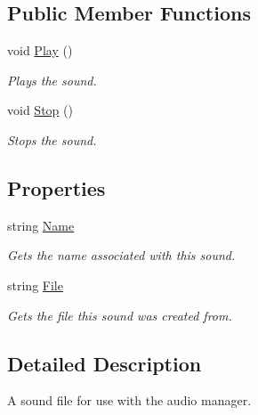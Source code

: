 \subsection*{Public Member Functions}
\begin{DoxyCompactItemize}
\item 
void \hyperlink{interface_tri_devs_1_1_tri_engine_1_1_audio_1_1_i_sound_aebcbc90990e32b903d2fda6d9fbe618a}{Play} ()
\begin{DoxyCompactList}\small\item\em Plays the sound. \end{DoxyCompactList}\item 
void \hyperlink{interface_tri_devs_1_1_tri_engine_1_1_audio_1_1_i_sound_a800d5a5531dee0eb4718c12bf76a7663}{Stop} ()
\begin{DoxyCompactList}\small\item\em Stops the sound. \end{DoxyCompactList}\end{DoxyCompactItemize}
\subsection*{Properties}
\begin{DoxyCompactItemize}
\item 
string \hyperlink{interface_tri_devs_1_1_tri_engine_1_1_audio_1_1_i_sound_a92371bfd019441c3766d5e61f126de82}{Name}
\begin{DoxyCompactList}\small\item\em Gets the name associated with this sound. \end{DoxyCompactList}\item 
string \hyperlink{interface_tri_devs_1_1_tri_engine_1_1_audio_1_1_i_sound_ad2ca796ca0364195acfc2f1d455d8d1e}{File}
\begin{DoxyCompactList}\small\item\em Gets the file this sound was created from. \end{DoxyCompactList}\end{DoxyCompactItemize}


\subsection{Detailed Description}
A sound file for use with the audio manager. 



